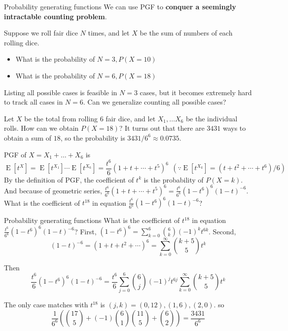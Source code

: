 \documentclass[8pt]{beamer}
\newcommand{\tb}[1]{\textbf{#1}}
\newcommand{\expec}[1]{\operatorname{E}\left[ #1 \right]}
\begin{document}
\begin{frame}{Probability generating functions}
    We can use PGF to \tb{conquer a seemingly intractable counting problem}.

    \bigskip
    Suppose we roll fair dice $N$ times, and let $X$ be the sum of numbers of each rolling dice.
    \begin{itemize}
        \item What is the probability of $N=3, P(X=10)$
        \item What is the probability of $N=6, P(X=18)$
    \end{itemize}
    Listing all possible cases is feasible in $N=3$ cases, but it becomes extremely hard to track all cases in $N=6$. Can we generalize counting all possible cases?

    \begin{example}
        Let $X$ be the total from rolling 6 fair dice, and let $X_1, \dots X_6$ be the individual rolls. How can we obtain $P(X=18)$? It turns out that there are $3431$ ways to obtain a sum of $18$, so the probability is $3431/6^6 \approx 0.0735$.
    \end{example}

    PGF of $X = X_1 + \dots + X_6$ is 
    \[
    \expec{t^X} = \expec{t^{X_1}}\cdots \expec{t^{X_6}} = \frac{t^6}{6}(1+t +\cdots + t^5)^6 \ \  (\because \expec{t^{X_k}} = (t + t^2 + \cdots + t^6) /6)
    \]
    By the definition of PGF, the coefficient of $t^k$ is the probability of $P(X=k)$. And because of geometric series, $\frac{t^6}{6^6} (1 + t + \cdots + t^5)^6 = \frac{t^6}{6^6} (1-t^6)^6 (1-t)^{-6}$.  What is the coefficient of $t^{18}$ in equation $\frac{t^6}{6^6} (1 - t^6)^6 (1 - t)^{-6}$?
\end{frame}

\begin{frame}{Probability generating functions}
    What is the coefficient of $t^{18}$ in equation $\frac{t^6}{6
    ^6} (1 - t^6)^6 (1-t)^{-6}$? First, $(1-t^6)^6 = \sum_{k=0}^6 \binom{6}{k} (-1)^{k}t^{6k}$. Second,
    \[
    (1-t)^{-6} = (1 + t + t^2 + \cdots)^6 = \sum_{k=0}^\infty \binom{k+5}{5} t^k
    \]

    Then 
    \[
        \frac{t^6}{6} (1-t^6)^6 (1-t)^{-6} = \frac{t^6}{6} \sum_{j=0}^6 \binom{6}{j} (-1)^j t^{6j} \sum_{k=0}^\infty \binom{k+5}{5} t^k
    \]

    The only case matches with $t^{18}$ is $(j,k) = (0, 12), (1, 6), (2, 0)$. so
    \[
        \frac{1}{6^6} \left(\binom{17}{5} +  (-1) \binom{6}{1} \binom{11}{5} + \binom{6}{2} \right) = \frac{3431}{6^6}
    \]
\end{frame}
\end{document}
